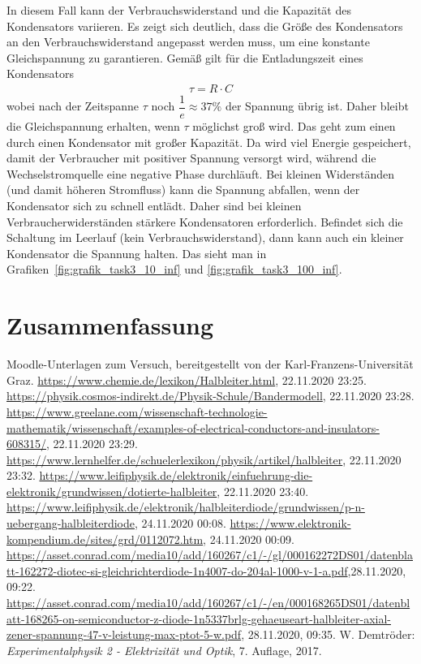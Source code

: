\documentclass{article}
\begin{document}
In diesem Fall kann der Verbrauchswiderstand und die Kapazität des Kondensators variieren. Es zeigt sich deutlich, dass die Größe des Kondensators an den Verbrauchswiderstand angepasst werden muss, um eine konstante Gleichspannung zu garantieren. Gemäß \cite{demtroeder} gilt für die Entladungszeit eines Kondensators
\begin{align*}
\tau = R\cdot C
\end{align*}
wobei nach der Zeitspanne $\tau$ noch $\dfrac{1}{e} \approx 37\%$ der Spannung übrig ist. Daher bleibt die Gleichspannung erhalten, wenn $\tau$ möglichst groß wird. Das geht zum einen durch einen Kondensator mit großer Kapazität. Da wird viel Energie gespeichert, damit der Verbraucher mit positiver Spannung versorgt wird, während die Wechselstromquelle eine negative Phase durchläuft. Bei kleinen Widerständen (und damit höheren Stromfluss) kann die Spannung abfallen, wenn der Kondensator sich zu schnell entlädt. Daher sind bei kleinen Verbraucherwiderständen stärkere Kondensatoren erforderlich. Befindet sich die Schaltung im Leerlauf (kein Verbrauchswiderstand), dann kann auch ein kleiner Kondensator die Spannung halten. Das sieht man in Grafiken~\ref{fig:grafik_task3_10_inf} und \ref{fig:grafik_task3_100_inf}.




\section{Zusammenfassung}




\begin{thebibliography}{9}
 Moodle-Unterlagen zum Versuch, bereitgestellt von der Karl-Franzens-Universität Graz.
 \url{https://www.chemie.de/lexikon/Halbleiter.html}, 22.11.2020 23:25.
 \url{https://physik.cosmos-indirekt.de/Physik-Schule/Bandermodell}, 22.11.2020 23:28.
 \url{https://www.greelane.com/wissenschaft-technologie-mathematik/wissenschaft/examples-of-electrical-conductors-and-insulators-608315/}, 22.11.2020 23:29.
 \url{https://www.lernhelfer.de/schuelerlexikon/physik/artikel/halbleiter}, 22.11.2020 23:32.
 \url{https://www.leifiphysik.de/elektronik/einfuehrung-die-elektronik/grundwissen/dotierte-halbleiter}, 22.11.2020 23:40.
 \url{https://www.leifiphysik.de/elektronik/halbleiterdiode/grundwissen/p-n-uebergang-halbleiterdiode}, 24.11.2020 00:08.
 \url{https://www.elektronik-kompendium.de/sites/grd/0112072.htm}, 24.11.2020 00:09.
 \url{https://asset.conrad.com/media10/add/160267/c1/-/gl/000162272DS01/datenblatt-162272-diotec-si-gleichrichterdiode-1n4007-do-204al-1000-v-1-a.pdf},28.11.2020, 09:22.
 \url{https://asset.conrad.com/media10/add/160267/c1/-/en/000168265DS01/datenblatt-168265-on-semiconductor-z-diode-1n5337brlg-gehaeuseart-halbleiter-axial-zener-spannung-47-v-leistung-max-ptot-5-w.pdf}, 28.11.2020, 09:35.
 W. Demtröder: \emph{Experimentalphysik 2 - Elektrizität  und Optik}, 7. Auflage, 2017.
\end{thebibliography}
\end{document}
